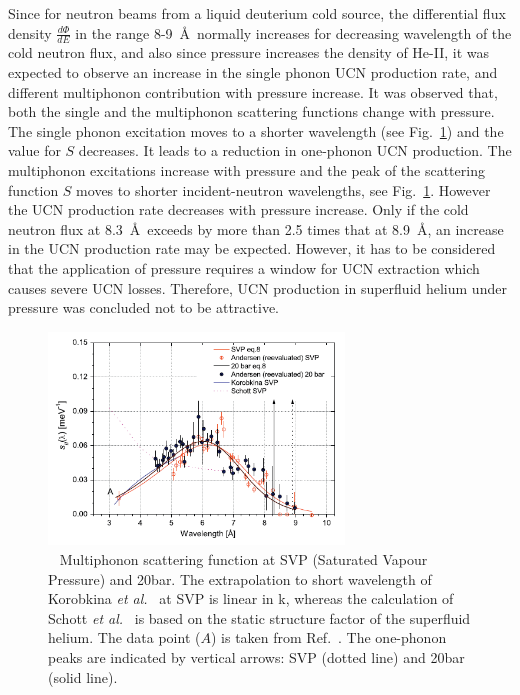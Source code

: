 Since for neutron beams from a liquid deuterium cold source, the
differential flux density $\frac{d\Phi}{dE}$ in the range
8-9~\AA~normally increases for decreasing wavelength of the cold
neutron flux, and also since pressure increases the density of He-II,
it was expected to observe an increase in the single phonon UCN
production rate, and different multiphonon contribution with pressure
increase.  It was observed that, both the single and the multiphonon
scattering functions change with pressure. The single phonon
excitation moves to a shorter wavelength (see
Fig.~\ref{fig:Schmidt_S}) and the value for $S$ decreases. It leads to
a reduction in one-phonon UCN production.  The multiphonon excitations
increase with pressure and the peak of the scattering function $S$
moves to shorter incident-neutron wavelengths, see
Fig.~\ref{fig:Schmidt_S}. However the UCN production rate decreases
with pressure increase.  Only if the cold neutron flux at
8.3~\AA~exceeds by more than 2.5 times that at 8.9~\AA, an increase in
the UCN production rate may be expected. However, it has to be
considered that the application of pressure requires a window for UCN
extraction which causes severe UCN losses. Therefore, UCN production
in superfluid helium under pressure was concluded not to be
attractive.




\begin{figure}[h!]
\begin{center}
   \includegraphics[width=0.7\textwidth]{Schmidt_S.PNG}
    \caption{~\cite{Schmidt2009} Multiphonon scattering function
      at SVP (Saturated Vapour Pressure) and 20bar. The extrapolation
      to short wavelength of Korobkina {\it {et
          al.}}~\cite{Korobkina2002} at SVP is linear in k,
      whereas the calculation of Schott {\it {et
          al.}}~\cite{Schott2003} is based on the static structure
      factor of the superfluid helium. The data point ($A$) is taken
      from Ref.~\cite{Fak1991}. The one-phonon peaks are indicated
      by vertical arrows: SVP (dotted line) and 20bar (solid line).  }
    \label{fig:Schmidt_S}
    \end{center}
\end{figure} 


